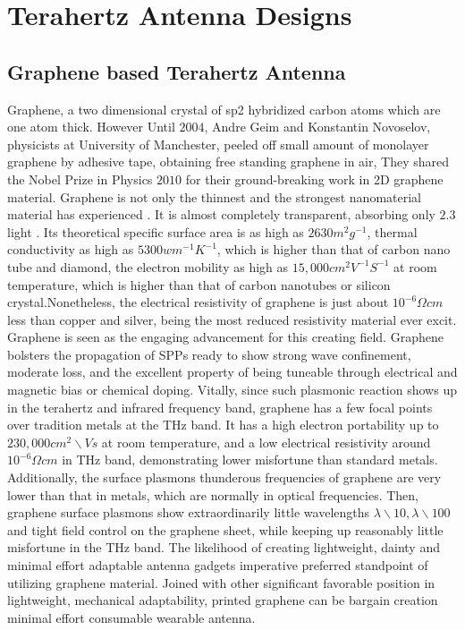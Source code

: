 \documentclass[12pt]{suhbook}
\begin{document}
\section{Terahertz  Antenna Designs}
% 
\subsection{Graphene based Terahertz Antenna}
% 
Graphene, a two dimensional crystal of sp2 hybridized carbon atoms which are one atom thick. However Until $2004$, Andre Geim and Konstantin Novoselov, physicists at University of Manchester, peeled off small amount of monolayer graphene by adhesive tape, obtaining free standing graphene in air, They shared the Nobel Prize in Physics $2010$ for their ground-breaking work in 2D graphene material. Graphene is not only the thinnest and the strongest nanomaterial material has experienced \cite{campos2008bulk}. It is almost completely transparent, absorbing only $2.3$ light . Its theoretical specific surface area is as high as $2630 m^2 g^{-1}$, thermal conductivity as high as $5300 w m^{-1} K^{-1}$, which is higher than that of carbon nano tube and diamond, the electron mobility as high as $15,000cm^2 V^{-1} S^{-1}$ at room temperature, which is higher than that of carbon nanotubes or silicon crystal\cite{ju2011graphene}.Nonetheless, the electrical resistivity of graphene is just about $10^{-6} \Omega cm$ less than copper and silver, being the most reduced resistivity material ever excit. Graphene is seen as the engaging advancement for this creating field. Graphene bolsters the propagation of SPPs ready to show strong wave confinement, moderate loss, and the excellent property of being tuneable through electrical and magnetic bias or chemical doping. Vitally, since such plasmonic reaction shows up in the terahertz and infrared frequency band, graphene has a few focal points over tradition metals at the THz band. It has a high electron portability up to $230,000 cm^2	\backslash Vs$ at room temperature, and a low electrical resistivity around $10^{-6} \Omega cm$ in THz band, demonstrating lower misfortune than standard metals\cite{ng2019printing}. Additionally, the surface plasmons thunderous frequencies of graphene are very lower than that in metals, which are normally in optical frequencies. Then, graphene surface plasmons show extraordinarily little wavelengths $\lambda\backslash 10 ,\lambda\backslash 100$ and tight field control on the graphene sheet, while keeping up reasonably little misfortune in the THz band. The likelihood of creating lightweight, dainty and minimal effort adaptable antenna gadgets imperative preferred standpoint of utilizing graphene material. Joined with other significant favorable position in lightweight, mechanical adaptability, printed graphene can be bargain creation minimal effort consumable wearable antenna.
\end{document}
